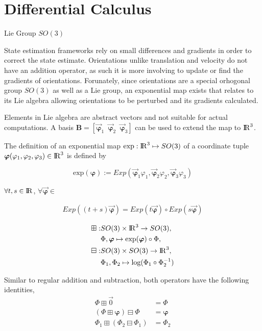 \section{Differential Calculus}

Lie Group $SO(3)$
\begin{itemize}
  \item{Not a vector space}
  \item{Has no addition operator
  \item{Has no subtraction operator
\end{itemize}

State estimation frameworks rely on small differences and gradients in order to
correct the state estimate. Orientations unlike translation and velocity do not
have an addition operator, as such it is more involving to update or
find the gradients of orientations. Forunately, since orientations are a
special orhogonal group $SO(3)$ as well as a Lie group, an exponential map
exists that relates to its Lie algebra allowing orientations to be perturbed
and its gradients calculated.

Elements in Lie algebra are abstract vectors and not suitable for actual
computations. A basis $\mathbf{B} = [\vec{\boldsymbol{\varphi}}_{1} \enspace
\vec{\boldsymbol{\varphi}}_{2} \enspace \vec{\boldsymbol{\varphi}}_{3}]$
can be used to extend the map to ${\rm I\!R}^{3}$. 

The definition of an exponential map $\text{exp} : {\rm I\!R}^{3} \mapsto SO(3)$ of a
coordinate tuple $\boldsymbol{\varphi} (\varphi_1, \varphi_2, \varphi_3) \in
{\rm I\!R}^{3}$ is defined by

\begin{equation}
  \text{exp}(\boldsymbol{\varphi}) := Exp(
    \vec{\boldsymbol{\varphi}}_{1}\varphi_{1},
    \vec{\boldsymbol{\varphi}}_{2}\varphi_{2},
    \vec{\boldsymbol{\varphi}}_{3}\varphi_{3}
  )
\end{equation}


$\forall t, s \in {\rm I\!R}$, $\forall \vec{\boldsymbol{\varphi}} \in $

\begin{align}
  Exp((t + s) \vec{\boldsymbol{\varphi}}) =
    Exp(t\vec{\boldsymbol{\varphi}}) \circ Exp(s\vec{\boldsymbol{\varphi}})
\end{align}


\begin{align}
  \boxplus :& SO(3) \times {\rm I\!R}^{3} \rightarrow SO(3), \\
    &\Phi, \boldsymbol{\varphi}
      \mapsto \text{exp}(\boldsymbol{\varphi}) \circ \Phi, \nonumber \\
  \boxminus :& SO(3) \times SO(3) \rightarrow {\rm I\!R}^{3}, \\
    &\Phi_1, \Phi_2 \mapsto \text{log}(\Phi_1 \circ \Phi_{2}^{-1}) \nonumber
\end{align}

Similar to regular addition and subtraction, both operators have the following
identities,
%
\begin{align}
  \Phi \boxplus \Vec{0} &= \Phi \\
  (\Phi \boxplus \boldsymbol{\varphi}) \boxminus \Phi &= \boldsymbol{\varphi} \\
  \Phi_1 \boxplus (\Phi_2 \boxminus \Phi_1) &= \Phi_2
\end{align}
